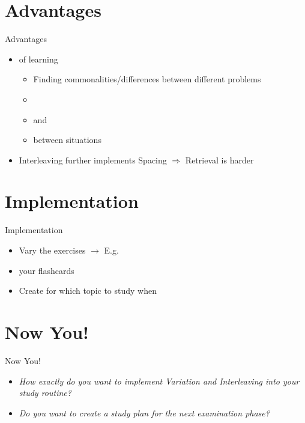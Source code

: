 \documentclass{ercisbeamer}
\begin{document}
\section{Advantages}
\begin{frame}{Advantages}
    \begin{itemize}
        \item {} of learning
        \begin{itemize}
            \item Finding commonalities/differences between different problems
            \item {}
            \item {} and 
            \item {} between situations
        \end{itemize}
        \item Interleaving further implements Spacing $\Rightarrow$ Retrieval is harder
    \end{itemize}
\end{frame}

\section{Implementation}
\begin{frame}{Implementation}
    \begin{itemize}
        \item Vary the exercises $\rightarrow$ E.g. 
        \item {} your flashcards
        \item Create  for which topic to study when 
    \end{itemize}
\end{frame}

\section{Now You!}
\begin{frame}{Now You!}
    \begin{itemize}
        \item \emph{How exactly do you want to implement Variation and Interleaving into your study routine?}
        \item \emph{Do you want to create a study plan for the next examination phase?}
    \end{itemize}
\end{frame}



\sources
\end{document}
